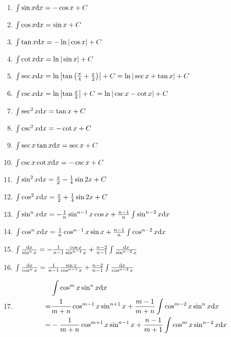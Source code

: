 \begin{enumerate}

\item $ \int \sin x \mathrm{d} x = -\cos x + C $

\item $ \int \cos x \mathrm{d} x = \sin x + C $

\item $ \int \tan x \mathrm{d} x = -\ln|\cos x| + C $

\item $ \int \cot x \mathrm{d} x = \ln |\sin x| + C $

\item $ \int \sec x \mathrm{d} x = \ln \left| \tan\left( \frac{\pi}{4} + \frac{x}{2} \right) \right| + C = \ln |\sec x + \tan x| + C $

\item $ \int \csc x \mathrm{d} x = \ln \left| \tan\frac{x}{2} \right| + C = \ln |\csc x - \cot x| + C $

\item $ \int \sec^2 x \mathrm{d} x = \tan x + C $

\item $ \int \csc^2 x \mathrm{d} x = -\cot x + C $

\item $ \int \sec x \tan x \mathrm{d} x = \sec x + C $

\item $ \int \csc x \cot x \mathrm{d} x = -\csc x + C $

\item $ \int \sin^2 x \mathrm{d} x = \frac{x}{2} - \frac{1}{4} \sin 2x + C $

\item $ \int \cos^2 x \mathrm{d} x = \frac{x}{2} + \frac{1}{4} \sin 2x + C $

\item $ \int \sin^n x \mathrm{d} x = -\frac{1}{n} \sin^{n-1} x \cos x + \frac{n-1}{n} \int \sin^{n-2} x \mathrm{d} x $

\item $ \int \cos^n x \mathrm{d} x = \frac{1}{n} \cos^{n-1} x \sin x + \frac{n-1}{n} \int \cos^{n-2} x \mathrm{d} x $

\item $ \int \frac{\mathrm{d} x}{\sin^n x} = -\frac{1}{n-1} \frac{\cos x}{\sin^{n-1}x} + \frac{n-2}{n-1} \int \frac{\mathrm{d} x}{\sin^{n-2}x} $

\item $ \int \frac{\mathrm{d} x}{\cos^n x} = \frac{1}{n-1} \frac{\sin x}{\cos^{n-1}x} + \frac{n-2}{n-1} \int \frac{\mathrm{d} x}{\cos^{n-2}x} $

\item \[ \begin{split} {} & \int \cos^m x \sin^n x \mathrm{d} x \\
	= & \frac{1}{m+n} \cos^{m-1} x \sin^{n+1}x + \frac{m-1}{m+n}\int\cos^{m-2}x\sin^nx\mathrm{d} x \\
	= & -\frac{1}{m+n} \cos^{m+1} x \sin^{n-1}x + \frac{n-1}{m+1} \int \cos^m x\sin^{n-2} x \mathrm{d} x \end{split} \]


\end{enumerate}
